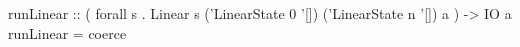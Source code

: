 \begin{code}
runLinear
    :: ( forall s
       . Linear s ('LinearState 0 '[])
                  ('LinearState n '[]) a
       )
    -> IO a
runLinear = coerce
\end{code}

